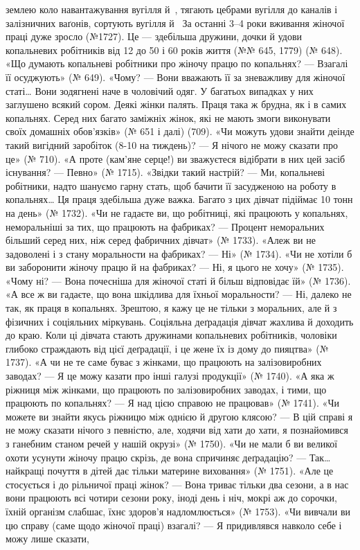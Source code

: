 \parcont{}  %
землею коло навантажування вугілля й~, тягають цебрами
вугілля до каналів і залізничних ваґонів, сортують вугілля й~ За останні 3--4 роки вживання жіночої праці дуже зросло
(№1727). Це — здебільша дружини, дочки й удови копальневих
робітників від 12 до 50 і 60 років життя (№№ 645, 1779) (№ 648).
«Що думають копальневі робітники про жіночу працю по копальнях?
— Взагалі її осуджують» (№ 649). «Чому? — Вони вважають
її за зневажливу для жіночої статі\dots{} Вони зодягнені наче в чоловічий
одяг. У багатьох випадках у них заглушено всякий сором.
Деякі жінки палять. Праця така ж брудна, як і в самих копальнях.
Серед них багато заміжніх жінок, які не мають змоги виконувати
своїх домашніх обов’язків» (№ 651 і далі) (709). «Чи
можуть удови знайти деінде такий вигідний заробіток (8-10 на тиждень)? — Я нічого не можу сказати про це»
(№ 710). «А проте (кам’яне серце!) ви зважуєтеся відібрати в
них цей засіб існування? — Певно» (№ 1715). «Звідки такий
настрій? — Ми, копальневі робітники, надто шануємо гарну
стать, щоб бачити її засудженою на роботу в копальнях\dots{} Ця
праця здебільша дуже важка. Багато з цих дівчат підіймає
10 тонн на день» (№ 1732). «Чи не гадаєте ви, що робітниці, які
працюють у копальнях, неморальніші за тих, що працюють на
фабриках? — Процент неморальних більший серед них, ніж серед
фабричних дівчат» (№ 1733). «Алеж ви не задоволені і з стану
моральности на фабриках? — Ні» (№ 1734). «Чи не хотіли б ви
заборонити жіночу працю й на фабриках? — Ні, я цього не хочу»
(№ 1735). «Чому ні? — Вона почесніша для жіночої статі й більш
відповідає їй» (№ 1736). «А все ж ви гадаєте, що вона шкідлива
для їхньої моральности? — Ні, далеко не так, як праця в копальнях.
Зрештою, я кажу це не тільки з моральних, але й з фізичних
і соціяльних міркувань. Соціяльна деґрадація дівчат жахлива
й доходить до краю. Коли ці дівчата стають дружинами копальневих
робітників, чоловіки глибоко страждають від цієї деґрадації,
і це жене їх із дому до пияцтва» (№ 1737). «А чи не те саме буває
з жінками, що працюють на залізовиробних заводах? — Я це
можу казати про інші галузі продукції» (№ 1740). «А яка ж ріжниця
між жінками, що працюють по залізовиробних заводах,
і тими, що працюють по копальнях? — Я над цією справою не
працював» (№ 1741). «Чи можете ви знайти якусь ріжницю
між однією й другою клясою? — В цій справі я не можу сказати
нічого з певністю, але, ходячи від хати до хати, я познайомився
з ганебним станом речей у нашій окрузі» (№ 1750). «Чи не мали б
ви великої охоти усунути жіночу працю скрізь, де вона спричиняє
деґрадацію? — Так\dots{} найкращі почуття в дітей дає тільки материне
виховання» (№ 1751). «Але це стосується і до рільничої
праці жінок? — Вона триває тільки два сезони, а в нас вони працюють
всі чотири сезони року, іноді день і ніч, мокрі аж до
сорочки, їхній організм слабшає, їхнє здоров’я надломлюється»
(№ 1753). «Чи вивчали ви цю справу (саме щодо жіночої праці)
взагалі? — Я придивлявся навколо себе і можу лише сказати,
\parbreak{}  %
